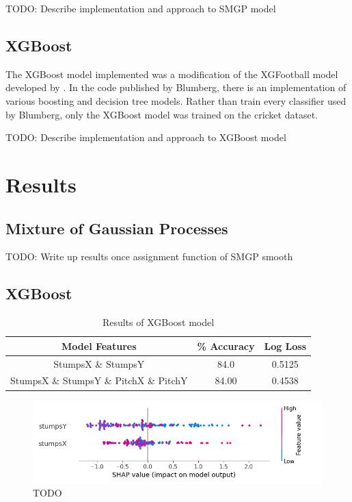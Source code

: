 \documentclass[12pt,a4paper]{report}
\theoremstyle{definition}
\begin{document}
TODO: Describe implementation and approach to SMGP model

\section{XGBoost}

The XGBoost \citep{Chen2016} model implemented was a modification of the XGFootball model developed by \citet{Blumberg2020}.
In the code published by Blumberg, there is an implementation of various boosting and decision tree models.
Rather than train every classifier used by Blumberg, only the XGBoost model was trained on the cricket dataset.

TODO: Describe implementation and approach to XGBoost model


\chapter{Results}

\section{Mixture of Gaussian Processes}

TODO: Write up results once assignment function of SMGP smooth

\section{XGBoost}

\begin{table}[H] \label{tab:XGResults}
	\centering
	\caption{Results of XGBoost model}
	\begin{tabular}{| c | c | c |} 
		\hline
		Model Features & \% Accuracy & Log Loss \\ [0.5ex] 
		\hline\hline
		StumpsX \& StumpsY & 84.0 & 0.5125 \\
		\hline
		StumpsX \& StumpsY \& PitchX \& PitchY & 84.00 & 0.4538 \\ [1ex]
		\hline
	\end{tabular}
\end{table}

\begin{figure}[H]
    \centering
    \includegraphics[width=\linewidth]{stumps_shap.png}
    \caption{TODO}
    \label{fig:ShapStumps}
\end{figure}
\end{document}
